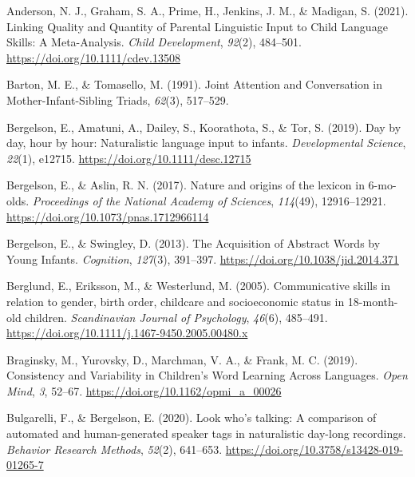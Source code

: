 \documentclass[
  man,floatsintext]{apa6}
\newlength{\cslhangindent}
\newlength{\cslentryspacingunit} %
\newenvironment{CSLReferences}[2] %
 {%
  \setlength{\parindent}{0pt}
  \ifodd #1
  \let\oldpar\par
  \def\par{\hangindent=\cslhangindent\oldpar}
  \fi
  \setlength{\parskip}{#2\cslentryspacingunit}
 }%
 {}
\begin{document}
\begingroup
\setlength{\parindent}{-0.5in}
\setlength{\leftskip}{0.5in}

\hypertarget{refs}{}
\begin{CSLReferences}{1}{0}
\leavevmode{}%
Anderson, N. J., Graham, S. A., Prime, H., Jenkins, J. M., \& Madigan, S. (2021). Linking {Quality} and {Quantity} of {Parental} {Linguistic} {Input} to {Child} {Language} {Skills}: {A} {Meta}-{Analysis}. \emph{Child Development}, \emph{92}(2), 484--501. \url{https://doi.org/10.1111/cdev.13508}

\leavevmode{}%
Barton, M. E., \& Tomasello, M. (1991). Joint {Attention} and {Conversation} in {Mother}-{Infant}-{Sibling} {Triads}, \emph{62}(3), 517--529.

\leavevmode{}%
Bergelson, E., Amatuni, A., Dailey, S., Koorathota, S., \& Tor, S. (2019). Day by day, hour by hour: {Naturalistic} language input to infants. \emph{Developmental Science}, \emph{22}(1), e12715. \url{https://doi.org/10.1111/desc.12715}

\leavevmode{}%
Bergelson, E., \& Aslin, R. N. (2017). Nature and origins of the lexicon in 6-mo-olds. \emph{Proceedings of the National Academy of Sciences}, \emph{114}(49), 12916--12921. \url{https://doi.org/10.1073/pnas.1712966114}

\leavevmode{}%
Bergelson, E., \& Swingley, D. (2013). The {Acquisition} of {Abstract} {Words} by {Young} {Infants}. \emph{Cognition}, \emph{127}(3), 391--397. \url{https://doi.org/10.1038/jid.2014.371}

\leavevmode{}%
Berglund, E., Eriksson, M., \& Westerlund, M. (2005). Communicative skills in relation to gender, birth order, childcare and socioeconomic status in 18-month-old children. \emph{Scandinavian Journal of Psychology}, \emph{46}(6), 485--491. \url{https://doi.org/10.1111/j.1467-9450.2005.00480.x}

\leavevmode{}%
Braginsky, M., Yurovsky, D., Marchman, V. A., \& Frank, M. C. (2019). Consistency and {Variability} in {Children}'s {Word} {Learning} {Across} {Languages}. \emph{Open Mind}, \emph{3}, 52--67. \url{https://doi.org/10.1162/opmi_a_00026}

\leavevmode{}%
Bulgarelli, F., \& Bergelson, E. (2020). Look who's talking: {A} comparison of automated and human-generated speaker tags in naturalistic day-long recordings. \emph{Behavior Research Methods}, \emph{52}(2), 641--653. \url{https://doi.org/10.3758/s13428-019-01265-7}


\end{CSLReferences}
\end{document}
